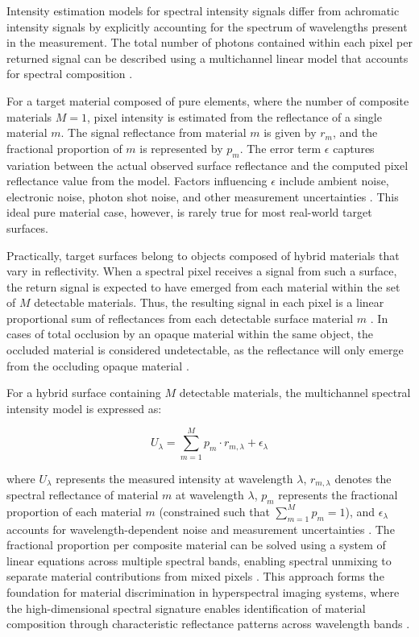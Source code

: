 \documentclass[12pt,a4paper,oneside]{report}
\begin{document}
Intensity estimation models for spectral intensity signals differ from achromatic intensity signals by explicitly accounting for the spectrum of wavelengths present in the measurement. The total number of photons contained within each pixel per returned signal can be described using a multichannel linear model that accounts for spectral composition \cite{heinz2001,schott2007}. 

For a target material composed of pure elements, where the number of composite materials $M = 1$, pixel intensity is estimated from the reflectance of a single material $m$. The signal reflectance from material $m$ is given by $r_m$, and the fractional proportion of $m$ is represented by $p_m$. The error term $\epsilon$ captures variation between the actual observed surface reflectance and the computed pixel reflectance value from the model. Factors influencing $\epsilon$ include ambient noise, electronic noise, photon shot noise, and other measurement uncertainties \cite{elachi2021,schott2007}. This ideal pure material case, however, is rarely true for most real-world target surfaces.

Practically, target surfaces belong to objects composed of hybrid materials that vary in reflectivity. When a spectral pixel receives a signal from such a surface, the return signal is expected to have emerged from each material within the set of $M$ detectable materials. Thus, the resulting signal in each pixel is a linear proportional sum of reflectances from each detectable surface material $m$ \cite{heinz2001,vasile2023}. In cases of total occlusion by an opaque material within the same object, the occluded material is considered undetectable, as the reflectance will only emerge from the occluding opaque material \cite{schott2007}.

For a hybrid surface containing $M$ detectable materials, the multichannel spectral intensity model is expressed as:

\begin{equation}
U_\lambda = \sum_{m=1}^{M} p_m \cdot r_{m,\lambda} + \epsilon_\lambda
\label{eq:spectral_mixture}
\end{equation}

where $U_\lambda$ represents the measured intensity at wavelength $\lambda$, $r_{m,\lambda}$ denotes the spectral reflectance of material $m$ at wavelength $\lambda$, $p_m$ represents the fractional proportion of each material $m$ (constrained such that $\sum_{m=1}^{M} p_m = 1$), and $\epsilon_\lambda$ accounts for wavelength-dependent noise and measurement uncertainties \cite{heinz2001,schott2007}. The fractional proportion per composite material can be solved using a system of linear equations across multiple spectral bands, enabling spectral unmixing to separate material contributions from mixed pixels \cite{heinz2001,vasile2023}. This approach forms the foundation for material discrimination in hyperspectral imaging systems, where the high-dimensional spectral signature enables identification of material composition through characteristic reflectance patterns across wavelength bands \cite{elachi2021,schott2007}.
\end{document}
